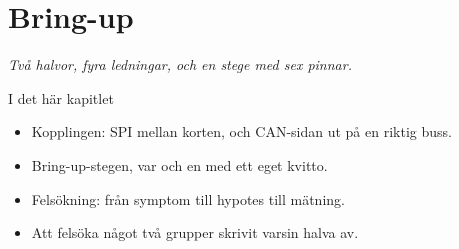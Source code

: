 \chapter{Bring-up}
\label{ch:bringup}


{\large\itshape Två halvor, fyra ledningar, och en stege med sex pinnar.\par}

\begin{chapterbox}{I det här kapitlet}
\begin{itemize}
  \item Kopplingen: SPI mellan korten, och CAN-sidan ut på en riktig buss.
  \item Bring-up-stegen, var och en med ett eget kvitto.
  \item Felsökning: från symptom till hypotes till mätning.
  \item Att felsöka något två grupper skrivit varsin halva av.
\end{itemize}
\end{chapterbox}




